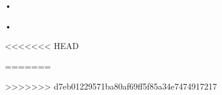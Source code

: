 \newcommand{\lastversion}{0.1.0}%
\newcommand{\doctitle}{Norme di progetto}%
\newcommand{\info}{\doctitle\ v\lastversion}
\begin{tiny}
{\tiny •}
\end{tiny}\begin{tiny}
•
\end{tiny}%


<<<<<<< HEAD

\setlength\parindent{0pt}
=======

>>>>>>> d7eb01229571ba80af69ff5f85a34e7474917217


\setcounter{page}{1}







 



